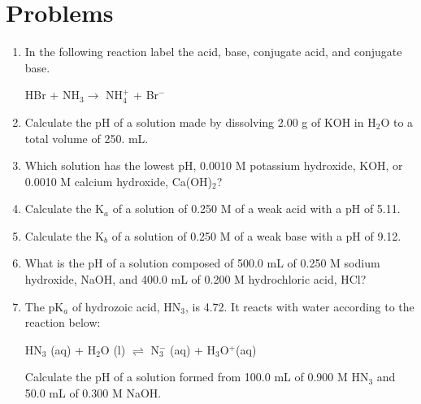 \documentclass[../chem.tex]{subfiles}
\begin{document}
\section*{Problems}
\begin{enumerate}
    \item In the following reaction label the acid, base, conjugate acid, and conjugate base.
    \begin{center}
        HBr + NH$_3 \rightarrow$ NH$_4^+$ + Br$^-$
    \end{center}
    \item Calculate the pH of a solution made by dissolving 2.00 g of KOH in H$_2$O to a total volume of 250. mL.
    \item Which solution has the lowest pH, 0.0010 M potassium hydroxide, KOH, or 0.0010 M calcium hydroxide, Ca(OH)$_2$?
    \item Calculate the K$_a$ of a solution of 0.250 M of a weak acid with a pH of 5.11.
    \item Calculate the K$_b$ of a solution of 0.250 M of a weak base with a pH of 9.12.
    \item What is the pH of a solution composed of 500.0 mL of 0.250 M sodium hydroxide, NaOH, and 400.0 mL of 0.200 M hydrochloric acid, HCl?
    \item The pK$_a$ of hydrozoic acid, HN$_3$, is 4.72. It reacts with water according to the reaction below:
    \begin{center}
        HN$_3$ (aq) + H$_2$O (l) $\rightleftharpoons$ N$_3^-$ (aq) + H$_3$O$^+$(aq)
    \end{center}
    Calculate the pH of a solution formed from 100.0 mL of 0.900 M HN$_3$ and 50.0 mL of 0.300 M NaOH.


\end{enumerate}
\end{document}
